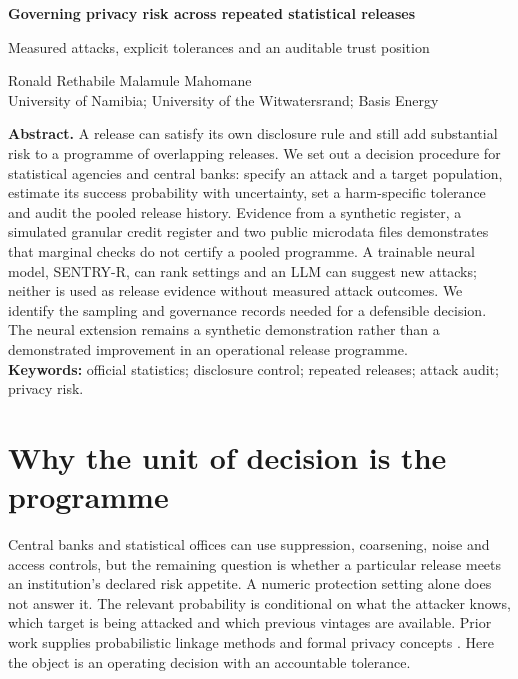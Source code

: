 \documentclass[10pt,a4paper]{article}
\begin{document}
\begin{center}
{\LARGE\bfseries Governing privacy risk across repeated statistical releases\par}
\vspace{5mm}
{\large Measured attacks, explicit tolerances and an auditable trust position\par}
\vspace{6mm}
Ronald Rethabile Malamule Mahomane\\
University of Namibia; University of the Witwatersrand; Basis Energy
\end{center}
\vspace{4mm}
\noindent\textbf{Abstract.} A release can satisfy its own disclosure rule and still add substantial risk to a programme of overlapping releases. We set out a decision procedure for statistical agencies and central banks: specify an attack and a target population, estimate its success probability with uncertainty, set a harm-specific tolerance and audit the pooled release history. Evidence from a synthetic register, a simulated granular credit register and two public microdata files demonstrates that marginal checks do not certify a pooled programme. A trainable neural model, SENTRY-R, can rank settings and an LLM can suggest new attacks; neither is used as release evidence without measured attack outcomes. We identify the sampling and governance records needed for a defensible decision. The neural extension remains a synthetic demonstration rather than a demonstrated improvement in an operational release programme.\\
\textbf{Keywords:} official statistics; disclosure control; repeated releases; attack audit; privacy risk.

\section{Why the unit of decision is the programme}
Central banks and statistical offices can use suppression, coarsening, noise and access controls, but the remaining question is whether a particular release meets an institution's declared risk appetite. A numeric protection setting alone does not answer it. The relevant probability is conditional on what the attacker knows, which target is being attacked and which previous vintages are available. Prior work supplies probabilistic linkage methods and formal privacy concepts \citep{fellegi1969,dwork2014}. Here the object is an operating decision with an accountable tolerance.
\end{document}
